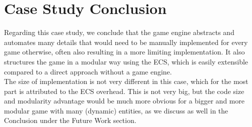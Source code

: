 \section{Case Study Conclusion}

Regarding this case study, we conclude that the game engine abstracts and automates many details that would need to be manually implemented for every game otherwise, often also resulting in a more limiting implementation. It also structures the game in a modular way using the ECS, which is easily extensible compared to a direct approach without a game engine.\\
The size of implementation is not very different in this case, which for the most part is attributed to the ECS overhead. This is not very big, but the code size and modularity advantage would be much more obvious for a bigger and more modular game with many (dynamic) entities, as we discuss as well in the Conclusion under the Future Work section.
